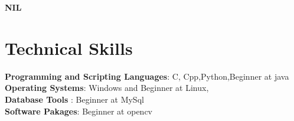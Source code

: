 \documentclass[margin,line]{res}
\begin{document}
\begin{resume}
\bf NIL
\vspace{.1in}
\section{\sc Technical Skills}
{\bf Programming and Scripting Languages}:  C, Cpp,Python,Beginner at java \\
{\bf Operating Systems}: Windows and Beginner at Linux,\\
{\bf Database Tools}  :  Beginner at MySql\\
{\bf Software Pakages}:  Beginner at opencv\\

\end{resume}
\end{document}

